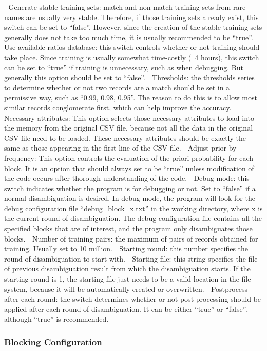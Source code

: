 \documentclass{article}
\begin{document}
 Generate stable training sets: match and non-match training sets from rare names are usually
very stable. Therefore, if those training sets already exist, this switch can be set to “false”.
However, since the creation of the stable training sets generally does not take too much time,
it is usually recommended to be “true”.
 Use available ratios database: this switch controls whether or not training should take place.
Since training is usually somewhat time-costly (~4 hours), this switch can be set to “true” if
training is unnecessary, such as when debugging. But generally this option should be set to
“false”.
 Thresholds: the thresholds series to determine whether or not two records are a match should
be set in a permissive way, such as “0.99, 0.98, 0.95”. The reason to do this is to allow most
similar records conglomerate first, which can help improve the accuracy.
 Necessary attributes: This option selects those necessary attributes to load into the memory
from the original CSV file, because not all the data in the original CSV file need to be loaded.
These necessary attributes should be exactly the same as those appearing in the first line of
the CSV file.
 Adjust prior by frequency: This option controls the evaluation of the priori probability for
each block. It is an option that should always set to be “true” unless modification of the code
occurs after thorough understanding of the code.
 Debug mode: this switch indicates whether the program is for debugging or not. Set to “false”
if a normal disambiguation is desired. In debug mode, the program will look for the debug
configuration file “debug\_block\_x.txt” in the working directory, where x is the current round
of disambiguation. The debug configuration file contains all the specified blocks that are of
interest, and the program only disambiguates those blocks.
 Number of training pairs: the maximum of pairs of records obtained for training. Usually set
to 10 million.
 Starting round: this number specifies the round of disambiguation to start with.
 Starting file: this string specifies the file of previous disambiguation result from which the
disambiguation starts. If the starting round is 1, the starting file just needs to be a valid
location in the file system, because it will be automatically created or overwritten.
 Postprocess after each round: the switch determines whether or not post-processing should be
applied after each round of disambiguation. It can be either “true” or “false”, although “true”
is recommended.


\subsubsection{Blocking Configuration}
\end{document}
